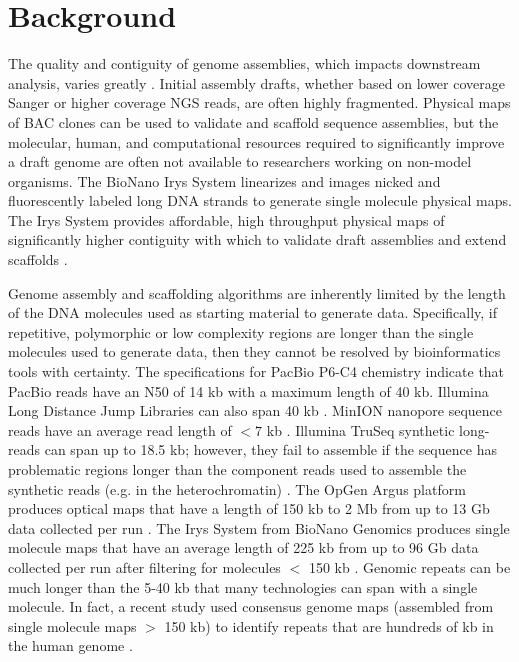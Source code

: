 \documentclass{bmcart}
\begin{document}

\section*{Background}

The quality and contiguity of genome assemblies, which impacts downstream analysis, varies greatly \cite{Gage2012,Feature-by-F2012,Assem22013}. Initial assembly drafts, whether based on lower coverage Sanger or higher coverage NGS reads, are often highly fragmented. Physical maps of BAC clones can be used to validate and scaffold sequence assemblies, but the molecular, human, and computational resources required to significantly improve a draft genome are often not available to researchers working on non-model organisms. The BioNano Irys\textregistered\textnormal{ }System linearizes and images nicked and fluorescently labeled long DNA strands to generate single molecule physical maps. The Irys System provides affordable, high throughput physical maps of significantly higher contiguity with which to validate draft assemblies and extend scaffolds \cite{BioNano2010}.


Genome assembly and scaffolding algorithms are inherently limited by the length of the DNA molecules used as starting material to generate data. Specifically, if repetitive, polymorphic or low complexity regions are longer than the single molecules used to generate data, then they cannot be resolved by bioinformatics tools with certainty. The specifications for PacBio P6-C4 chemistry \cite{PacBioSpecs} indicate that PacBio reads have an N50 of 14 kb with a maximum length of 40 kb. Illumina Long Distance Jump Libraries can also span 40 kb \cite{LDJSpecs}. MinION nanopore sequence reads have an average read length of $< 7$ kb \cite{Nanopore2014}. Illumina TruSeq synthetic long-reads can span up to 18.5 kb; however, they fail to assemble if the sequence has problematic regions longer than the component reads used to assemble the synthetic reads (e.g. in the heterochromatin) \cite{Moleculo2014}. The OpGen Argus \cite{Argos2009} platform produces optical maps that have a length of 150 kb to 2 Mb from up to 13 Gb data collected per run \cite{OpgenSpecs}. The Irys System from BioNano Genomics produces single molecule maps that have an average length of 225 kb from up to 96 Gb data collected per run after filtering for molecules $<$ 150 kb \cite{BioNanoSpecs}. Genomic repeats can be much longer than the 5-40 kb that many technologies can span with a single molecule. In fact, a recent study used consensus genome maps (assembled from single molecule maps $>$ 150 kb) to identify repeats that are hundreds of kb in the human genome \cite{BioNanoSV2014}.
\end{document}
